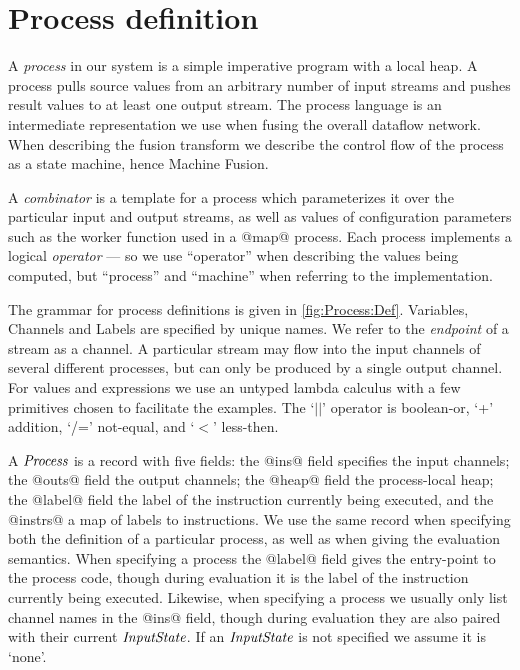 \section{Process definition}

A \emph{process} in our system is a simple imperative program with a local heap. A process pulls source values from an arbitrary number of input streams and pushes result values to at least one output stream. The process language is an intermediate representation we use when fusing the overall dataflow network. When describing the fusion transform we describe the control flow of the process as a state machine, hence Machine Fusion. 

A \emph{combinator} is a template for a process which parameterizes it over the particular input and output streams, as well as values of configuration parameters such as the worker function used in a @map@ process. Each process implements a logical \emph{operator} --- so we use ``operator'' when describing the values being computed, but ``process'' and ``machine'' when referring to the implementation. 



The grammar for process definitions is given in \autoref{fig:Process:Def}. Variables, Channels and Labels are specified by unique names. We refer to the \emph{endpoint} of a stream as a channel. A particular stream may flow into the input channels of several different processes, but can only be produced by a single output channel. For values and expressions we use an untyped lambda calculus with a few primitives chosen to facilitate the examples. The `$||$' operator is boolean-or, `+' addition, `/=' not-equal, and `$<$' less-then.

A $\textit{Process}$ is a record with five fields: the @ins@ field specifies the input channels; the @outs@ field the output channels; the @heap@ field the process-local heap; the @label@ field the label of the instruction currently being executed, and the @instrs@ a map of labels to instructions. We use the same record when specifying both the definition of a particular process, as well as when giving the evaluation semantics. When specifying a process the @label@ field gives the entry-point to the process code, though during evaluation it is the label of the instruction currently being executed. Likewise, when specifying a process we usually only list channel names in the @ins@ field, though during evaluation they are also paired with their current $\textit{InputState}$. If an $\textit{InputState}$ is not specified we assume it is `none'.

